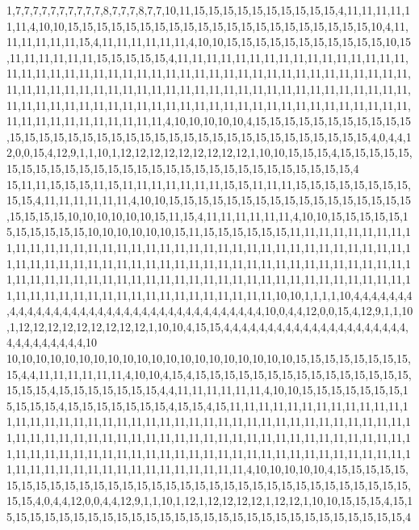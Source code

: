 1,7,7,7,7,7,7,7,7,7,7,8,7,7,7,8,7,7,10,11,15,15,15,15,15,15,15,15,15,15,4,11,11,11,11,11,11,4,10,10,15,15,15,15,15,15,15,15,15,15,15,15,15,15,15,15,15,15,15,15,15,10,4,11,11,11,11,11,11,15,4,11,11,11,11,11,11,4,10,10,15,15,15,15,15,15,15,15,15,15,15,10,15,11,11,11,11,11,11,15,15,15,15,15,4,11,11,11,11,11,11,11,11,11,11,11,11,11,11,11,11,11,11,11,11,11,11,11,11,11,11,11,11,11,11,11,11,11,11,11,11,11,11,11,11,11,11,11,11,11,11,11,11,11,11,11,11,11,11,11,11,11,11,11,11,11,11,11,11,11,11,11,11,11,11,11,11,11,11,11,11,11,11,11,11,11,11,11,11,11,11,11,11,11,11,11,11,11,11,11,11,11,11,11,11,11,11,11,11,11,11,11,11,11,11,11,4,10,10,10,10,10,4,15,15,15,15,15,15,15,15,15,15,15,15,15,15,15,15,15,15,15,15,15,15,15,15,15,15,15,15,15,15,15,15,15,15,15,15,4,0,4,4,12,0,0,15,4,12,9,1,1,10,1,12,12,12,12,12,12,12,12,12,1,10,10,15,15,15,4,15,15,15,15,15,15,15,15,15,15,15,15,15,15,15,15,15,15,15,15,15,15,15,15,15,15,15,15,15,4
15,11,11,15,15,15,11,15,11,11,11,11,11,11,11,15,15,11,11,11,15,15,15,15,15,15,15,15,15,15,4,11,11,11,11,11,11,4,10,10,15,15,15,15,15,15,15,15,15,15,15,15,15,15,15,15,15,15,15,15,15,10,10,10,10,10,10,15,11,15,4,11,11,11,11,11,11,4,10,10,15,15,15,15,15,15,15,15,15,15,15,10,10,10,10,10,10,15,11,15,15,15,15,15,15,11,11,11,11,11,11,11,11,11,11,11,11,11,11,11,11,11,11,11,11,11,11,11,11,11,11,11,11,11,11,11,11,11,11,11,11,11,11,11,11,11,11,11,11,11,11,11,11,11,11,11,11,11,11,11,11,11,11,11,11,11,11,11,11,11,11,11,11,11,11,11,11,11,11,11,11,11,11,11,11,11,11,11,11,11,11,11,11,11,11,11,11,11,11,11,11,11,11,11,11,11,11,11,11,11,11,11,11,11,11,11,10,10,1,1,1,1,10,4,4,4,4,4,4,4,4,4,4,4,4,4,4,4,4,4,4,4,4,4,4,4,4,4,4,4,4,4,4,4,4,4,4,4,4,10,0,4,4,12,0,0,15,4,12,9,1,1,10,1,12,12,12,12,12,12,12,12,12,1,10,10,4,15,15,4,4,4,4,4,4,4,4,4,4,4,4,4,4,4,4,4,4,4,4,4,4,4,4,4,4,4,4,4,4,10
10,10,10,10,10,10,10,10,10,10,10,10,10,10,10,10,10,10,10,10,15,15,15,15,15,15,15,15,15,4,4,11,11,11,11,11,11,4,10,10,4,15,4,15,15,15,15,15,15,15,15,15,15,15,15,15,15,15,15,15,15,4,15,15,15,15,15,15,15,4,4,11,11,11,11,11,11,4,10,10,15,15,15,15,15,15,15,15,15,15,15,4,15,15,15,15,15,15,15,4,15,15,4,15,11,11,11,11,11,11,11,11,11,11,11,11,11,11,11,11,11,11,11,11,11,11,11,11,11,11,11,11,11,11,11,11,11,11,11,11,11,11,11,11,11,11,11,11,11,11,11,11,11,11,11,11,11,11,11,11,11,11,11,11,11,11,11,11,11,11,11,11,11,11,11,11,11,11,11,11,11,11,11,11,11,11,11,11,11,11,11,11,11,11,11,11,11,11,11,11,11,11,11,11,11,11,11,11,11,11,11,11,11,11,11,11,11,4,10,10,10,10,10,4,15,15,15,15,15,15,15,15,15,15,15,15,15,15,15,15,15,15,15,15,15,15,15,15,15,15,15,15,15,15,15,15,15,15,15,4,0,4,4,12,0,0,4,4,12,9,1,1,10,1,12,1,12,12,12,12,1,12,12,1,10,10,15,15,15,4,15,15,15,15,15,15,15,15,15,15,15,15,15,15,15,15,15,15,15,15,15,15,15,15,15,15,15,15,15,4
